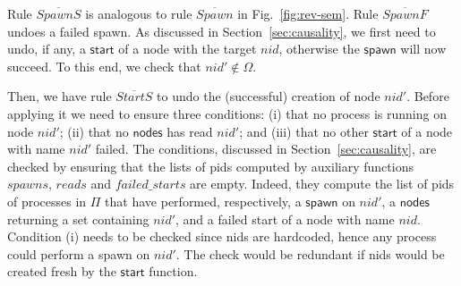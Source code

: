 \documentclass[runningheads]{llncs}
\newcommand{\ms}[1]{\mathsf{#1}}
\newcommand{\nill}{[\:]}
\newcommand{\ol}[1]{\overline{#1}}
\begin{document}
%
Rule $\overline{SpawnS}$ is analogous to rule $\overline{Spawn}$ in
Fig.~\ref{fig:rev-sem}. Rule $\overline{SpawnF}$ undoes a failed
spawn. As discussed in Section~\ref{sec:causality}, we first need to
undo, if any, a $\ms{start}$ of a node with the target $nid$,
otherwise the $\ms{spawn}$ will now succeed. To this end, we check
that $nid' \notin \Omega$.


Then, we have rule $\ol{StartS}$ to undo the (successful) creation of
node $nid'$. Before applying it we need to ensure three conditions:
(i) that no process is running on node $nid'$; (ii) that no
$\ms{nodes}$ has read $nid'$; and (iii) that no other $\ms{start}$ of
a node with name $nid'$ failed. The conditions, discussed in
Section~\ref{sec:causality}, are checked by ensuring that the lists of
pids computed by auxiliary functions $spawns$, $reads$ and
$failed\_starts$ are empty. Indeed, they compute the list of pids of processes in $\Pi$ that have performed, respectively, a $\ms{spawn}$ on $nid'$, a $\ms{nodes}$ returning a set containing $nid'$, and a failed start of a node with name $nid$.
Condition (i) needs to be checked
since nids are hardcoded, hence any process could
perform a spawn on $nid'$.
The check would be redundant if nids would
be created fresh by the $\ms{start}$ function.
\end{document}
